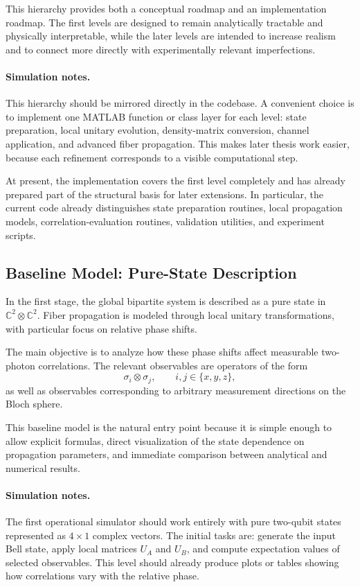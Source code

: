 \documentclass[a4paper]{article}
\begin{document}
This hierarchy provides both a conceptual roadmap and an implementation roadmap. The first levels are designed to remain analytically tractable and physically interpretable, while the later levels are intended to increase realism and to connect more directly with experimentally relevant imperfections.

\paragraph{Simulation notes.}
This hierarchy should be mirrored directly in the codebase. A convenient choice is to implement one MATLAB function or class layer for each level: state preparation, local unitary evolution, density-matrix conversion, channel application, and advanced fiber propagation. This makes later thesis work easier, because each refinement corresponds to a visible computational step.

At present, the implementation covers the first level completely and has already prepared part of the structural basis for later extensions. In particular, the current code already distinguishes state preparation routines, local propagation models, correlation-evaluation routines, validation utilities, and experiment scripts.

\subsection{Baseline Model: Pure-State Description}

In the first stage, the global bipartite system is described as a pure state in \(\mathbb{C}^2 \otimes \mathbb{C}^2\). Fiber propagation is modeled through local unitary transformations, with particular focus on relative phase shifts.

The main objective is to analyze how these phase shifts affect measurable two-photon correlations. The relevant observables are operators of the form
\[
\sigma_i \otimes \sigma_j,
\qquad i,j \in \{x,y,z\},
\]
as well as observables corresponding to arbitrary measurement directions on the Bloch sphere.

This baseline model is the natural entry point because it is simple enough to allow explicit formulas, direct visualization of the state dependence on propagation parameters, and immediate comparison between analytical and numerical results.

\paragraph{Simulation notes.}
The first operational simulator should work entirely with pure two-qubit states represented as \(4 \times 1\) complex vectors. The initial tasks are: generate the input Bell state, apply local matrices \(U_A\) and \(U_B\), and compute expectation values of selected observables. This level should already produce plots or tables showing how correlations vary with the relative phase.
\end{document}
